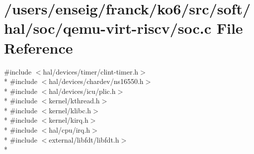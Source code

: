 \hypertarget{qemu-virt-riscv_2soc_8c}{\section{/users/enseig/franck/ko6/src/soft/hal/soc/qemu-\/virt-\/riscv/soc.c File Reference}
\label{qemu-virt-riscv_2soc_8c}
}
{\ttfamily \#include $<$hal/devices/timer/clint-\/timer.\-h$>$}\\*
{\ttfamily \#include $<$hal/devices/chardev/ns16550.\-h$>$}\\*
{\ttfamily \#include $<$hal/devices/icu/plic.\-h$>$}\\*
{\ttfamily \#include $<$kernel/kthread.\-h$>$}\\*
{\ttfamily \#include $<$kernel/klibc.\-h$>$}\\*
{\ttfamily \#include $<$kernel/kirq.\-h$>$}\\*
{\ttfamily \#include $<$hal/cpu/irq.\-h$>$}\\*
{\ttfamily \#include $<$external/libfdt/libfdt.\-h$>$}\\*
